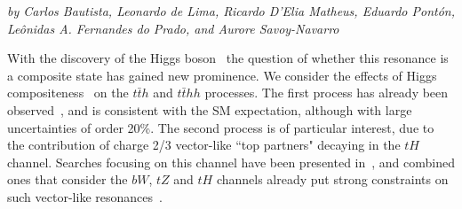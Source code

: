 \begin{center}
{\it{by Carlos Bautista, Leonardo de Lima, Ricardo D'Elia Matheus, Eduardo Pont\'on, Le\^onidas A. Fernandes do Prado, and Aurore Savoy-Navarro}}
\end{center}

\label{sec9:MCHMtthh}
With the discovery of the Higgs boson~\cite{Aad:2012tfa,
CMSHiggsJuly2012} the question of whether this resonance is a
composite state has gained new prominence.  We consider the effects of
Higgs compositeness~\cite{Kaplan:1983fs, Kaplan:1983sm, Georgi:1984ef, Georgi:1984af, Dugan:1984hq} on the $t\bar{t}h$ and
$t\bar{t}  h h$ processes.  The first process has already been
observed~\cite{Aaboud:2018urx, Sirunyan:2018hoz}, and is consistent
with the SM expectation, although with large uncertainties of order
20\%.  The second process is of particular interest, due to the contribution of charge 2/3 vector-like ``top partners" decaying in the $tH$ channel. Searches focusing on
this channel have been presented in~\cite{Aaboud:2018xuw}, and
combined ones that consider the $bW$, $tZ$ and $tH$ channels
already put strong constraints on such vector-like
resonances~\cite{Aaboud:2018pii, Sirunyan:2018omb}.
